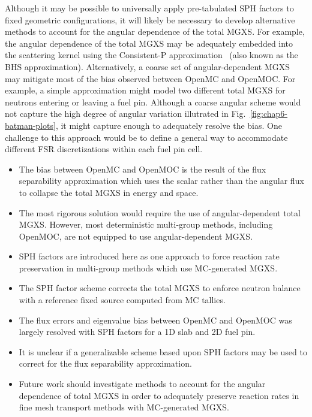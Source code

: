Although it may be possible to universally apply pre-tabulated \ac{SPH} factors to fixed geometric configurations, it will likely be necessary to develop alternative methods to account for the angular dependence of the total \ac{MGXS}. For example, the angular dependence of the total \ac{MGXS} may be adequately embedded into the scattering kernel using the Consistent-P approximation~\cite{bell1967transport} (also known as the BHS approximation). Alternatively, a coarse set of angular-dependent \ac{MGXS} may mitigate most of the bias observed between OpenMC and OpenMOC. For example, a simple approximation might model two different total \ac{MGXS} for neutrons entering or leaving a fuel pin. Although a coarse angular scheme would not capture the high degree of angular variation illutrated in Fig.~\ref{fig:chap6-batman-plots}, it might capture enough to adequately resolve the bias. One challenge to this approach would be to define a general way to accommodate different \ac{FSR} discretizations within each fuel pin cell.

\clearpage

\vfill
\begin{highlightsbox}[frametitle=Highlights]
\begin{itemize}
  \item The bias between OpenMC and OpenMOC is the result of the flux separability approximation which uses the scalar rather than the angular flux to collapse the total \ac{MGXS} in energy and space.
  \item The most rigorous solution would require the use of angular-dependent total \ac{MGXS}. However, most deterministic multi-group methods, including OpenMOC, are not equipped to use angular-dependent \ac{MGXS}.
  \item \ac{SPH} factors are introduced here as one approach to force reaction rate preservation in multi-group methods which use \ac{MC}-generated \ac{MGXS}.
  \item The \ac{SPH} factor scheme corrects the total \ac{MGXS} to enforce neutron balance with a reference fixed source computed from \ac{MC} tallies.
  \item The flux errors and eigenvalue bias between OpenMC and OpenMOC was largely resolved with \ac{SPH} factors for a 1D slab and 2D fuel pin.
  \item It is unclear if a generalizable scheme based upon \ac{SPH} factors may be used to correct for the flux separability approximation.
  \item Future work should investigate methods to account for the angular dependence of total \ac{MGXS} in order to adequately preserve reaction rates in fine mesh transport methods with \ac{MC}-generated \ac{MGXS}.
\end{itemize}
\end{highlightsbox}
\vfill